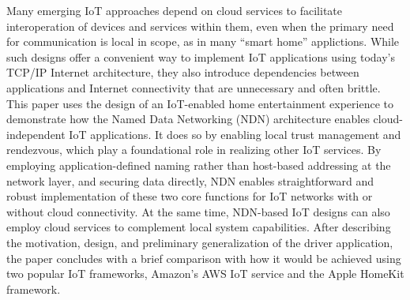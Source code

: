 Many emerging IoT approaches depend on cloud services to facilitate interoperation of devices and services within them, even when the primary need for communication is local in scope, as in many ``smart home'' applictions.
While such designs offer a convenient way to implement IoT applications using today's TCP/IP Internet architecture, they also introduce dependencies between  applications and Internet connectivity that are unnecessary and often brittle.
This paper uses the design of an IoT-enabled home entertainment experience to demonstrate how the Named Data Networking (NDN) architecture enables cloud-independent IoT applications.
It does so by enabling local trust management and rendezvous, which play a foundational role in realizing other IoT services.  By employing application-defined naming rather than host-based addressing at the network layer, and securing data directly,
NDN enables straightforward and robust implementation of these two core functions for IoT networks with or without cloud connectivity.
At the same time, 
NDN-based IoT designs can also employ cloud services to complement local system capabilities.  After describing the motivation, design, and preliminary generalization of the driver application, the paper concludes with a brief comparison with how it would be achieved using two popular IoT frameworks, Amazon's AWS IoT service and the Apple HomeKit framework.
